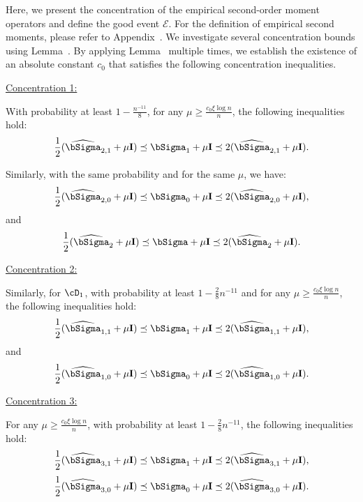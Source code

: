 \documentclass[12pt,a4paper,pdftex,onepage]{article}
\newcommand{\Sighat}{\widehat{{\bSigma}}}
\newcommand{\Sigmatreated}{\bSigma_{1}}
\newcommand{\Sigmacontrol}{\bSigma_{0}}
\newcommand{\event}{\mathscr{E}}
\begin{document}
Here, we present the concentration of the empirical second-order moment operators and define the good event \(\event\). For the definition of empirical second moments, please refer to Appendix~. We investigate several concentration bounds using Lemma~. By applying Lemma~ multiple times, we establish the existence of an absolute constant \(c_0\) that satisfies the following concentration inequalities.

\underline{Concentration 1:} \quad 

With probability at least $1 - \frac{n^{-11}}{8}$, for any $\mu \geq \frac{c_0 \xi \log n}{n}$, the following inequalities hold:
\begin{align*}
\frac{1}{2}(\Sighat_{2,1} + \mu \mathbf{I}) \preceq \Sigmatreated + \mu \mathbf{I} \preceq 2(\Sighat_{2,1} + \mu \mathbf{I}).
\end{align*}

Similarly, with the same probability and for the same $\mu$, we have:
\begin{align*}
\frac{1}{2}(\Sighat_{2,0} + \mu \mathbf{I}) \preceq \Sigmacontrol + \mu \mathbf{I} \preceq 2(\Sighat_{2,0} + \mu \mathbf{I}),
\end{align*}
and
\begin{align*}
\frac{1}{2}(\Sighat_{2} + \mu \mathbf{I}) \preceq \bSigma + \mu \mathbf{I} \preceq 2(\Sighat_{2} + \mu \mathbf{I}).
\end{align*}

\underline{Concentration 2:} \quad 

Similarly, for $\cD_1$, with probability at least $1 - \frac{2}{8}n^{-11}$ and for any $\mu \geq \frac{c_0 \xi \log n}{n}$, the following inequalities hold:
\begin{align*}
\frac{1}{2}(\Sighat_{1,1} + \mu \mathbf{I}) \preceq \Sigmatreated + \mu \mathbf{I} \preceq 2(\Sighat_{1,1} + \mu \mathbf{I}),
\end{align*}
and
\begin{align*}
\frac{1}{2}(\Sighat_{1,0} + \mu \mathbf{I}) \preceq \Sigmacontrol + \mu \mathbf{I} \preceq 2(\Sighat_{1,0} + \mu \mathbf{I}).
\end{align*}

\underline{Concentration 3:} \quad 

For any $\mu \geq \frac{c_0 \xi \log n}{n}$, with probability at least $1 - \frac{2}{8}n^{-11}$, the following inequalities hold:
\begin{align*}
\frac{1}{2}(\Sighat_{3,1} + \mu \mathbf{I}) \preceq \Sigmatreated + \mu \mathbf{I} \preceq 2(\Sighat_{3,1} + \mu \mathbf{I}),
\end{align*}
\begin{align*}
\frac{1}{2}(\Sighat_{3,0} + \mu \mathbf{I}) \preceq \Sigmacontrol + \mu \mathbf{I} \preceq 2(\Sighat_{3,0} + \mu \mathbf{I}).
\end{align*}
\end{document}
